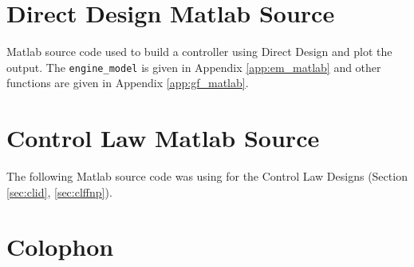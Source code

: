 \documentclass{article}
\begin{document}


\clearpage





\clearpage
\section{Direct Design Matlab Source}
\label{app:dd_matlab}

Matlab source code used to build a controller using Direct Design
and plot the output.
The \verb+engine_model+ is given in Appendix \ref{app:em_matlab}
and other functions are given in Appendix \ref{app:gf_matlab}.



\clearpage



\clearpage
\section{Control Law Matlab Source}
\label{app:cl_matlab}

The following Matlab source code was using for the Control Law Designs
(Section \ref{sec:clid}, \ref{sec:clffnp}).






\clearpage
\section{Colophon}
\label{app:colophon}
\end{document}
